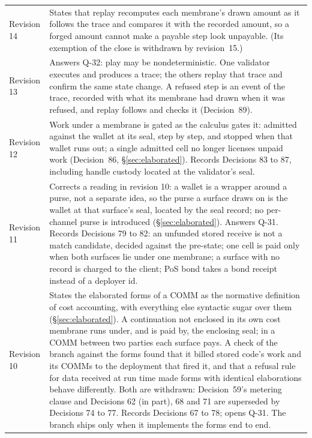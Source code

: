 \documentclass[11pt]{article}
\begin{document}
\begin{center}
\begin{tabular}{@{}lP{10.6cm}@{}}
Revision 14 & States that replay recomputes each membrane's drawn amount as it follows the trace and compares it with the recorded amount, so a forged amount cannot make a payable step look unpayable. (Its exemption of the close is withdrawn by revision~15.) \\
Revision 13 & Answers Q-32: play may be nondeterministic. One validator executes and produces a trace; the others replay that trace and confirm the same state change. A refused step is an event of the trace, recorded with what its membrane had drawn when it was refused, and replay follows and checks it (Decision~89). \\
Revision 12 & Work under a membrane is gated as the calculus gates it: admitted against the wallet at its seal, step by step, and stopped when that wallet runs out; a single admitted cell no longer licenses unpaid work (Decision~86, \S\ref{sec:elaborated}). Records Decisions 83 to 87, including handle custody located at the validator's seal. \\
Revision 11 & Corrects a reading in revision 10: a wallet is a wrapper around a purse, not a separate idea, so the purse a surface draws on is the wallet at that surface's seal, located by the seal record; no per-channel purse is introduced (\S\ref{sec:elaborated}). Answers Q-31. Records Decisions 79 to 82: an unfunded stored receive is not a match candidate, decided against the pre-state; one cell is paid only when both surfaces lie under one membrane; a surface with no record is charged to the client; PoS bond takes a bond receipt instead of a deployer id. \\
Revision 10 & States the elaborated forms of a COMM as the normative definition of cost accounting, with everything else syntactic sugar over them (\S\ref{sec:elaborated}). A continuation not enclosed in its own cost membrane runs under, and is paid by, the enclosing seal; in a COMM between two parties each surface pays. A check of the branch against the forms found that it billed stored code's work and its COMMs to the deployment that fired it, and that a refusal rule for data received at run time made forms with identical elaborations behave differently. Both are withdrawn: Decision~59's metering clause and Decisions 62 (in part), 68 and 71 are superseded by Decisions 74 to 77. Records Decisions 67 to 78; opens Q-31. The branch ships only when it implements the forms end to end. \\

\end{tabular}
\end{center}
\end{document}
